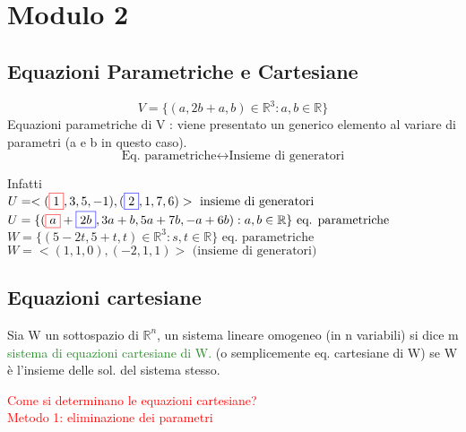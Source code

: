
\section{Modulo 2}

\subsection{Equazioni Parametriche e Cartesiane}

\[
V = \{ (a,2b + a, b) \in \mathbb{R}^3 : a,b \in \mathbb{R}\}
\]
\textsf{\small Equazioni parametriche di V : viene presentato un generico elemento al variare di parametri (a e b in questo caso).}\\
\[
\boxed{\text{Eq. parametriche}} \longleftrightarrow \boxed{\text{Insieme di generatori}}
\]

\textsf{\small Infatti }\\
\(
U = <(\color{red}\boxed{\normalcolor 1}\normalcolor,3,5,-1),(\color{blue}\boxed{\normalcolor 2}\normalcolor,1,7,6)> \text{ insieme di generatori}
\)\\
\(
U = \{ (\color{red}\boxed{\normalcolor a}\normalcolor + \color{blue}\boxed{\normalcolor 2b}\normalcolor, 3a + b, 5a + 7b, -a + 6b) : a,b \in \mathbb{R}\} \text{ eq. parametriche}
\)\\
\(
W = \{ (5 - 2t, 5 + t, t) \in \mathbb{R}^3 : s,t \in \mathbb{R}\} \text{ eq. parametriche}
\)\\
\(
W = <(1,1,0),(-2,1,1)> \text{ (insieme di generatori)}
\)\\

\subsection{Equazioni cartesiane}

\begin{definition}
	Sia W un sottospazio di $\mathbb{R}^n$, un sistema lineare omogeneo (in n variabili) si dice m \textcolor{ForestGreen}{sistema di equazioni cartesiane di W.} (o semplicemente eq. cartesiane di W) se W è l'insieme delle sol. del sistema stesso.
\end{definition}
\vskip-2.5mm
\textcolor{red}{Come si determinano le equazioni cartesiane?}\\

\textcolor{red}{Metodo 1: eliminazione dei parametri}\\

